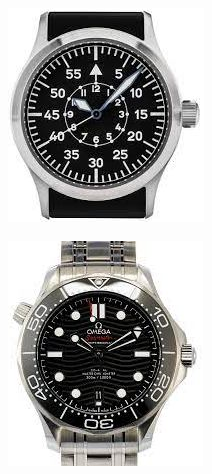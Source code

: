 \begin{multicols}{4}
\begin{figure}[H]
  \centering
  \includegraphics[width=\linewidth]{6x8-temps/stowa.jpeg}
\end{figure}

\begin{figure}[H]
  \centering
  \includegraphics[width=\linewidth]{6x8-temps/omega.jpeg}
\end{figure}


\end{multicols}
